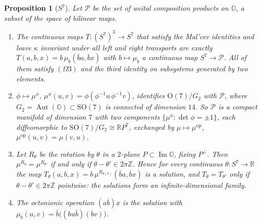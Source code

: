 \documentclass[11pt,reqno]{amsart}
\newtheorem{proposition}[theorem]{Proposition}
\theoremstyle{definition}
\theoremstyle{remark}
\numberwithin{equation}{section}
\newcommand{\R}{\mathbb{R}}
\newcommand{\Z}{\mathbb{Z}}
\newcommand{\Aut}{\operatorname{Aut}}
\newcommand{\im}{\operatorname{Im}}
\newcommand{\SO}{\mathrm{SO}}
\newcommand{\OO}{\mathrm{O}}
\begin{document}
\begin{proposition}[$S^7$]\label{prop:S7}
Let $\mathcal P$ be the set of unital composition products on $\mathbb O$, a subset of the space of bilinear maps.
\begin{enumerate}[label=(\roman*)]
\item The continuous maps $T\colon(S^7)^3\to S^7$ that satisfy the Mal'cev identities and leave $\kappa$ invariant under all left and
right transports are exactly $T(a,b,x)=b\,\mu_b(\bar ba,\bar bx)$ with $b\mapsto\mu_b$ a continuous map $S^7\to\mathcal P$.  All of them
satisfy $(\Omega3)$ and the third identity on subsystems generated by two elements.
\item $\phi\mapsto\mu^\phi$, $\mu^\phi(u,v)=\phi(\phi^{-1}u\,\phi^{-1}v)$, identifies $\OO(7)/G_2$ with $\mathcal P$, where $G_2=\Aut(\mathbb O)\subset\SO(7)$
is connected of dimension $14$.  So $\mathcal P$ is a compact manifold of dimension $7$ with two components $\{\mu^\phi:\det\phi=\pm1\}$,
each diffeomorphic to $\SO(7)/G_2\cong\R P^7$, exchanged by $\mu\mapsto\mu^{\mathrm{op}}$, $\mu^{\mathrm{op}}(u,v)=\mu(v,u)$.
\item Let $R_\theta$ be the rotation by $\theta$ in a $2$-plane $P\subset\im\mathbb O$, fixing $P^\perp$.  Then $\mu^{R_\theta}=\mu^{R_{\theta'}}$ if and only
if $\theta-\theta'\in2\pi\Z$.  Hence for every continuous $\theta\colon S^7\to\R$ the map $T_\theta(a,b,x)=b\,\mu^{R_{\theta(b)}}(\bar ba,\bar bx)$ is
a solution, and $T_\theta=T_{\theta'}$ only if $\theta-\theta'\in2\pi\Z$ pointwise: the solutions form an infinite-dimensional family.
\item The octonionic operation $(a\bar b)x$ is the solution with $\mu_b(u,v)=\bar b\bigl((bu\bar b)(bv)\bigr)$.
\end{enumerate}
\end{proposition}
\end{document}
